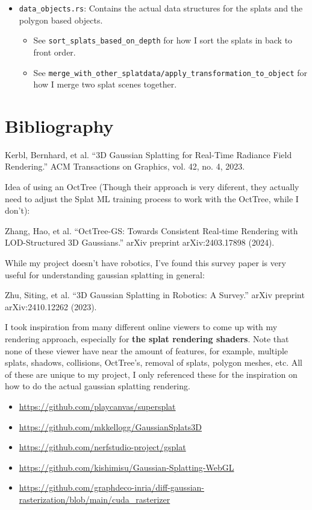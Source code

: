 \documentclass {article}
\begin{document}
\begin{itemize}
\item \lstinline[style=inlinecode]{data_objects.rs}: Contains the actual data structures for the splats and the polygon based objects.
    \begin{itemize}
        \item See \lstinline[style=inlinecode]{sort_splats_based_on_depth} for how I sort the splats in back to front order.
        \item See \lstinline[style=inlinecode]{merge_with_other_splatdata/apply_transformation_to_object} for how I merge two splat scenes together.
    \end{itemize}
\end{itemize}



\section{Bibliography}
     Kerbl, Bernhard, et al. “3D Gaussian Splatting for Real-Time Radiance Field Rendering.” ACM Transactions on Graphics, vol. 42, no. 4, 2023.

     Idea of using an OctTree (Though their approach is very diferent, they actually need to adjust the Splat ML training process to work with the OctTree, while I don't):

     Zhang, Hao, et al. “OctTree-GS: Towards Consistent Real-time Rendering with LOD-Structured 3D Gaussians.” arXiv preprint arXiv:2403.17898 (2024).


     While my project doesn't have robotics, I've found this survey paper is very useful for understanding gaussian splatting in general:

     Zhu, Siting, et al. “3D Gaussian Splatting in Robotics: A Survey.” arXiv preprint arXiv:2410.12262 (2023).


     I took inspiration from many different online viewers to come up with my rendering approach, especially for \textbf{the splat rendering shaders}. Note that none of these viewer have near the amount of features, for example, multiple splats, shadows, collisions, OctTree's, removal of splats, polygon meshes, etc. All of these are unique to my project, I only referenced these for the inspiration on how to do the actual gaussian splatting rendering.
     \begin{itemize}
          \item \href{https://github.com/playcanvas/supersplat}{https://github.com/playcanvas/supersplat}
          \item \href{https://github.com/mkkellogg/GaussianSplats3D}{https://github.com/mkkellogg/GaussianSplats3D}
          \item \href{https://github.com/nerfstudio-project/gsplat}{https://github.com/nerfstudio-project/gsplat}
          \item \href{https://github.com/kishimisu/Gaussian-Splatting-WebGL}{https://github.com/kishimisu/Gaussian-Splatting-WebGL}
          \item \href{https://github.com/graphdeco-inria/diff-gaussian-rasterization/blob/main/cuda\_rasterizer}{https://github.com/graphdeco-inria/diff-gaussian-rasterization/blob/main/cuda\_rasterizer}
     \end{itemize}
\end{document}
